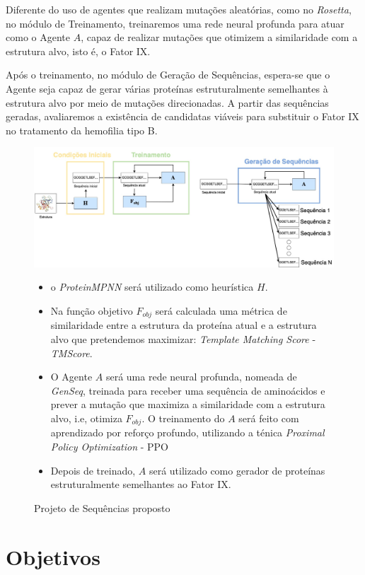 Diferente do uso de agentes que realizam mutações aleatórias, como no \textit{Rosetta}, no módulo de Treinamento, treinaremos uma rede neural profunda para atuar como o Agente $A$,
capaz de realizar mutações que otimizem a similaridade com a estrutura alvo, isto é, o Fator IX.

Após o treinamento, no módulo de Geração de Sequências, 
espera-se que o Agente seja capaz de gerar várias proteínas estruturalmente semelhantes à estrutura alvo por meio de mutações direcionadas. 
A partir das sequências geradas, avaliaremos a existência de candidatas viáveis para substituir o Fator IX no tratamento da hemofilia tipo B.



\begin{figure}[H]
  \centering
  \includegraphics[width=.8\textwidth]{figuras/metodologia-pipeline_proposta.jpg}
  \begin{itemize}
  \item o \textit{ProteinMPNN} será utilizado como heurística $H$. 
  \item Na função objetivo $F_{obj}$ será calculada uma métrica de similaridade entre a estrutura da proteína atual 
  e a estrutura alvo que pretendemos maximizar: \textit{Template Matching Score} - \textit{TMScore}.
  \item O Agente $A$ será uma rede neural profunda, nomeada de  \textit{GenSeq},
  treinada para receber uma sequência de aminoácidos e prever a mutação que maximiza a similaridade com a estrutura alvo, i.e, otimiza $F_{obj}$. 
  O treinamento do $A$ será feito com aprendizado por reforço profundo, utilizando a ténica \textit{Proximal Policy Optimization} - PPO
  \item Depois de treinado, $A$ será utilizado como gerador de proteínas estruturalmente semelhantes ao Fator IX. 
\end{itemize}
  \caption{Projeto de Sequências proposto} 
  \label{fig:proposta}
\end{figure}

\section{Objetivos} 

